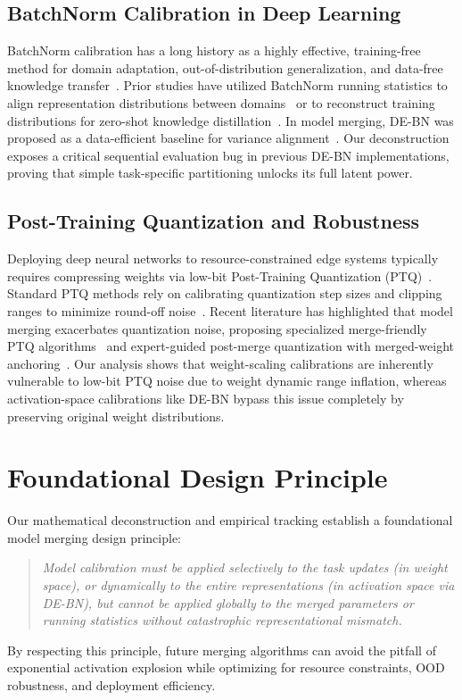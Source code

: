 \documentclass{article}
\begin{document}
\subsection{BatchNorm Calibration in Deep Learning}
BatchNorm calibration has a long history as a highly effective, training-free method for domain adaptation, out-of-distribution generalization, and data-free knowledge transfer~\cite{ioffe2015batch,santurkar2018how}. Prior studies have utilized BatchNorm running statistics to align representation distributions between domains~\cite{kim2024task,lubana2021theoretical} or to reconstruct training distributions for zero-shot knowledge distillation~\cite{shen2020data,yin2020dreaming,cai2020zero}. In model merging, DE-BN was proposed as a data-efficient baseline for variance alignment~\cite{submission10}. Our deconstruction exposes a critical sequential evaluation bug in previous DE-BN implementations, proving that simple task-specific partitioning unlocks its full latent power.

\subsection{Post-Training Quantization and Robustness}
Deploying deep neural networks to resource-constrained edge systems typically requires compressing weights via low-bit Post-Training Quantization (PTQ)~\cite{han2015deep,gholami2021survey}. Standard PTQ methods rely on calibrating quantization step sizes and clipping ranges to minimize round-off noise~\cite{nagel2020up,frantar2022gptq,hubara2021improving,jacob2018quantization}. Recent literature has highlighted that model merging exacerbates quantization noise, proposing specialized merge-friendly PTQ algorithms~\cite{shin2025merge} and expert-guided post-merge quantization with merged-weight anchoring~\cite{wang2026epmq}. Our analysis shows that weight-scaling calibrations are inherently vulnerable to low-bit PTQ noise due to weight dynamic range inflation, whereas activation-space calibrations like DE-BN bypass this issue completely by preserving original weight distributions.

\section{Foundational Design Principle}
\label{sec:principle}
Our mathematical deconstruction and empirical tracking establish a foundational model merging design principle:
\begin{quote}
    \textit{Model calibration must be applied selectively to the task updates (in weight space), or dynamically to the entire representations (in activation space via DE-BN), but cannot be applied globally to the merged parameters or running statistics without catastrophic representational mismatch.}
\end{quote}
By respecting this principle, future merging algorithms can avoid the pitfall of exponential activation explosion while optimizing for resource constraints, OOD robustness, and deployment efficiency.
\end{document}
